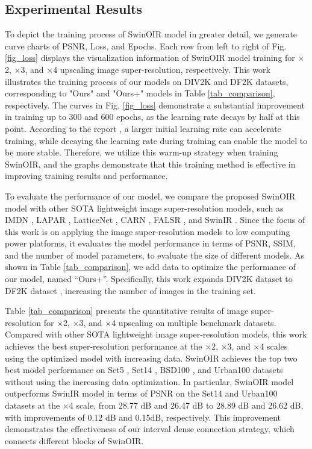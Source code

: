\documentclass[default,iicol]{sn-jnl}
\theoremstyle{thmstyleone}\newtheorem{theorem}{Theorem}\newtheorem{proposition}[theorem]{Proposition}
\theoremstyle{thmstyletwo}\newtheorem{example}{Example}\newtheorem{remark}{Remark}\theoremstyle{thmstylethree}\newtheorem{definition}{Definition}
\begin{document}
\subsection{Experimental Results}
To depict the training process of SwinOIR model in greater detail, we generate curve charts of PSNR, Loss, and Epochs. Each row from left to right of Fig. \ref{fig_loss} displays the visualization information of SwinOIR model training for $\times$2, $\times$3, and $\times$4 upscaling image super-resolution, respectively. This work illustrates the training process of our models on DIV2K \cite{Ignatov2018} and DF2K \cite{timofte2017ntire} datasets, corresponding to "Ours" and "Ours+" models in Table \ref{tab_comparison}, respectively. The curves in Fig. \ref{fig_loss} demonstrate a substantial improvement in training up to 300 and 600 epochs, as the learning rate decays by half at this point. According to the report \cite{liang2021swinir}, a larger initial learning rate can accelerate training, while decaying the learning rate during training can enable the model to be more stable. Therefore, we utilize this warm-up strategy when training SwinOIR, and the graphs demonstrate that this training method is effective in improving training results and performance.

To evaluate the performance of our model, we compare the proposed SwinOIR model with other SOTA lightweight image super-resolution models, such as IMDN \cite{hui2019lightweight}, LAPAR \cite{li2020lapar}, LatticeNet \cite{luo2020latticenet}, CARN \cite{ahn2018fast}, FALSR \cite{chu2021fast}, and SwinIR \cite{liang2021swinir}. Since the focus of this work is on applying the image super-resolution models to low computing power platforms, it evaluates the model performance in terms of PSNR, SSIM, and the number of model parameters, to evaluate the size of different models. As shown in Table \ref{tab_comparison}, we add data to optimize the performance of our model, named ``Ours+''. Specifically, this work expands DIV2K dataset \cite{Ignatov2018} to DF2K dataset \cite{timofte2017ntire}, increasing the number of images in the training set.

Table \ref{tab_comparison} presents the quantitative results of image super-resolution for $\times$2, $\times$3, and $\times$4 upscaling on multiple benchmark datasets. Compared with other SOTA lightweight image super-resolution models, this work achieves the best super-resolution performance at the $\times$2, $\times$3, and $\times$4 scales using the optimized model with increasing data. SwinOIR achieves the top two best model performance on Set5 \cite{bevilacqua2012low}, Set14 \cite{zeyde2012single}, BSD100 \cite{martin2001database}, and Urban100 \cite{huang2015single} datasets without using the increasing data optimization. In particular, SwinOIR model outperforms SwinIR model in terms of PSNR on the Set14 and Urban100 datasets at the $\times$4 scale, from 28.77 dB and 26.47 dB to 28.89 dB and 26.62 dB, with improvements of 0.12 dB and 0.15dB, respectively. This improvement demonstrates the effectiveness of our interval dense connection strategy, which connects different blocks of SwinOIR.
\end{document}
